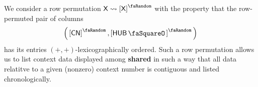 We consider a row permutation $\col{X}\rightsquigarrow\order{\col{X}}$ with the property that the row-permuted pair of columns
\[
	\Big( \order{\cn} , \order{\hubStamp} \Big)
\]
has its entries $(+,+)$-lexicographically ordered. Such a row permutation allows us to list context data displayed among \textbf{shared} in such a way that all data relatitve to a given (nonzero) context number is contiguous and listed chronologically.
